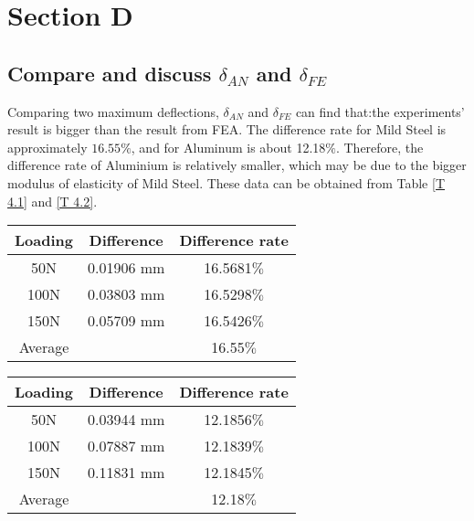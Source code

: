\section{Section D}
\subsection{Compare and discuss $\delta _{AN}$ and $\delta _{FE}$}
Comparing two maximum deflections, $\delta _{AN}$ and $\delta _{FE}$ can find that:the experiments' result  is bigger than the result from FEA. The difference rate for Mild Steel is approximately $16.55\%$, and for Aluminum is about 12.18$\%$. Therefore, the difference rate of Aluminium is relatively smaller, which may be due to the bigger modulus of elasticity of Mild Steel. These data can be obtained from Table \ref{T 4.1} and \ref{T 4.2}.

\begin{minipage}[c]{0.5\textwidth}
	\label{T 4.1}
	\centering
	\begin{tabular}{@{}ccc@{}}
		\toprule
		Loading & Difference & Difference rate \\ \midrule
		50N     & 0.01906 mm & 16.5681$\%$     \\
		100N    & 0.03803 mm & 16.5298$\%$     \\
		150N    & 0.05709 mm & 16.5426$\%$     \\ \midrule
		Average &            & 16.55$\%$           \\ \bottomrule
	\end{tabular}
\end{minipage}
\begin{minipage}[c]{0.5\textwidth}
	\label{T 4.2}
	\centering
		\begin{tabular}{@{}ccc@{}}
			\toprule
			Loading & Difference & Difference rate \\ \midrule
			50N     & 0.03944 mm & 12.1856$\%$     \\
			100N    & 0.07887 mm & 12.1839$\%$     \\
			150N    & 0.11831 mm & 12.1845$\%$     \\ \midrule
			Average &            & 12.18$\%$           \\ \bottomrule
		\end{tabular}
\end{minipage}
\newpage
